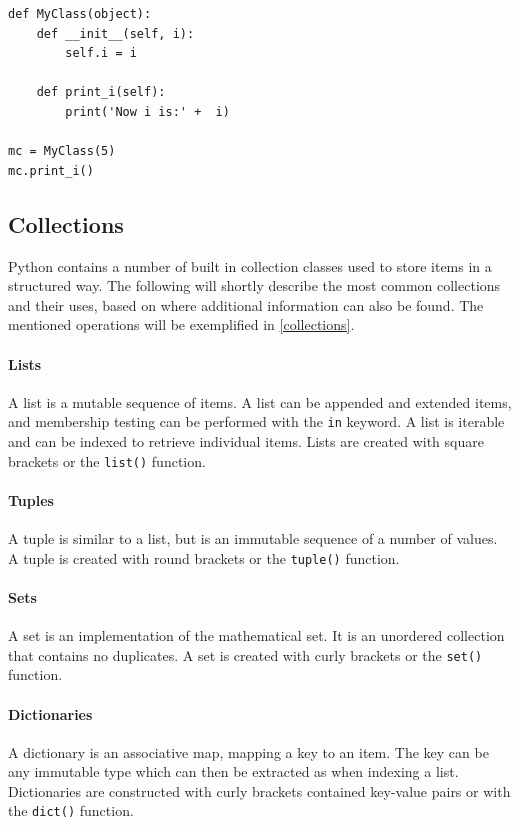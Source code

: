 \begin{lstlisting}[style=python, caption={Class definition}, label=class_definition]
def MyClass(object):
    def __init__(self, i):
        self.i = i

    def print_i(self):
        print('Now i is:' +  i)

mc = MyClass(5)
mc.print_i()        
\end{lstlisting}

\subsection{Collections}
Python contains a number of built in collection classes used to store items in a structured way.
The following will shortly describe the most common collections and their uses, based on \citet{python_datastructures} where additional information can also be found.
The mentioned operations will be exemplified in \cref{collections}.


\paragraph{Lists} A list is a mutable sequence of items.
A list can be appended and extended items, and membership testing can be performed with the \texttt{in} keyword.
A list is iterable and can be indexed to retrieve individual items.
Lists are created with square brackets or the \texttt{list()} function.

\paragraph{Tuples} A tuple is similar to a list, but is an immutable sequence of a number of values.
A tuple is created with round brackets or the \texttt{tuple()} function.

\paragraph{Sets} A set is an implementation of the mathematical set.
It is an unordered collection that contains no duplicates.
A set is created with curly brackets or the \texttt{set()} function.

\paragraph{Dictionaries} A dictionary is an associative map, mapping a key to an item.
The key can be any immutable type which can then be extracted as when indexing a list.
Dictionaries are constructed with curly brackets contained key-value pairs or with the \texttt{dict()} function.

